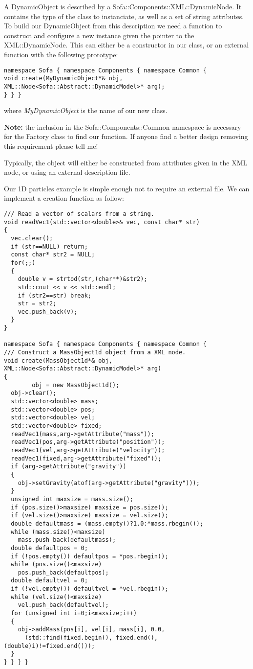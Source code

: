 A DynamicObject is described by a Sofa::Components::XML::DynamicNode. It contains the type of the class to instanciate, as well as a set of string attributes. To build our DynamicObject from this description we need a function to construct and configure a new instance given the pointer to the XML::DynamicNode. This can either be a constructor in our class, or an external function with the following prototype:
\begin{verbatim}
namespace Sofa { namespace Components { namespace Common {
void create(MyDynamicObject*& obj, XML::Node<Sofa::Abstract::DynamicModel>* arg);
} } }
\end{verbatim}
where \textit{MyDynamicObject} is the name of our new class.

\textbf{Note:} the inclusion in the Sofa::Components::Common namespace is necessary for the Factory class to find our function. If anyone find a better design removing this requirement please tell me!

Typically, the object will either be constructed from attributes given in the XML node, or using an external description file.

Our 1D particles example is simple enough not to require an external file. We can implement a creation function as follow:

\begin{verbatim}
/// Read a vector of scalars from a string.
void readVec1(std::vector<double>& vec, const char* str)
{
  vec.clear();
  if (str==NULL) return;
  const char* str2 = NULL;
  for(;;)
  {
    double v = strtod(str,(char**)&str2);
    std::cout << v << std::endl;
    if (str2==str) break;
    str = str2;
    vec.push_back(v);
  }
}

namespace Sofa { namespace Components { namespace Common {
/// Construct a MassObject1d object from a XML node.
void create(MassObject1d*& obj, XML::Node<Sofa::Abstract::DynamicModel>* arg)
{
        obj = new MassObject1d();
  obj->clear();
  std::vector<double> mass;
  std::vector<double> pos;
  std::vector<double> vel;
  std::vector<double> fixed;
  readVec1(mass,arg->getAttribute("mass"));
  readVec1(pos,arg->getAttribute("position"));
  readVec1(vel,arg->getAttribute("velocity"));
  readVec1(fixed,arg->getAttribute("fixed"));
  if (arg->getAttribute("gravity"))
  {
    obj->setGravity(atof(arg->getAttribute("gravity")));
  }
  unsigned int maxsize = mass.size();
  if (pos.size()>maxsize) maxsize = pos.size();
  if (vel.size()>maxsize) maxsize = vel.size();
  double defaultmass = (mass.empty()?1.0:*mass.rbegin());
  while (mass.size()<maxsize)
    mass.push_back(defaultmass);
  double defaultpos = 0;
  if (!pos.empty()) defaultpos = *pos.rbegin();
  while (pos.size()<maxsize)
    pos.push_back(defaultpos);
  double defaultvel = 0;
  if (!vel.empty()) defaultvel = *vel.rbegin();
  while (vel.size()<maxsize)
    vel.push_back(defaultvel);
  for (unsigned int i=0;i<maxsize;i++)
  {
    obj->addMass(pos[i], vel[i], mass[i], 0.0,
      (std::find(fixed.begin(), fixed.end(), (double)i)!=fixed.end()));
  }
} } } }
\end{verbatim}

